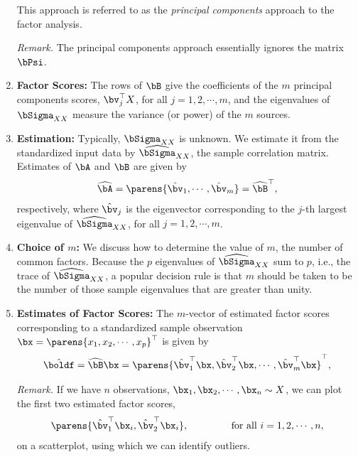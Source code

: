 \documentclass[12pt]{article}
\begin{document}
\begin{enumerate}[label=\textbf{\arabic*.}]
	This approach is referred to as the \emph{principal components} approach to the factor analysis. 
	
	\textit{Remark.} The principal components approach essentially ignores the matrix $\bPsi$. 
	
	\item \textbf{Factor Scores:} The rows of $\bB$ give the coefficients of the $m$ principal components scores, $\bv_j^\top X$, for all $j = 1, 2, \cdots, m$, and the eigenvalues of $\bSigma_{XX}$ measure the variance (or power) of the $m$ sources. 
	
	\item \textbf{Estimation:} Typically, $\bSigma_{XX}$ is unknown. We estimate it from the standardized input data by $\widehat{\bSigma}_{XX}$, the sample correlation matrix. Estimates of $\bA$ and $\bB$ are given by 
	\begin{align}
		\widehat{\bA} = \parens{\hat{\bv}_1, \cdots, \hat{\bv}_m} = \widehat{\bB}^\top, 
	\end{align}
	respectively, where $\hat{\bv}_j$ is the eigenvector corresponding to the $j$-th largest eigenvalue of $\widehat{\bSigma}_{XX}$, for all $j = 1, 2, \cdots, m$. 
	
	\item \textbf{Choice of $m$:} We discuss how to determine the value of $m$, the number of common factors. Because the $p$ eigenvalues of $\widehat{\bSigma}_{XX}$ sum to $p$, i.e., the trace of $\widehat{\bSigma}_{XX}$, a popular decision rule is that $m$ should be taken to be the number of those sample eigenvalues that are greater than unity. 
	
	\item \textbf{Estimates of Factor Scores:} The $m$-vector of estimated factor scores corresponding to a standardized sample observation $\bx = \parens{x_1, x_2, \cdots, x_p}^\top$ is given by 
	\begin{align}
		\hat{\boldf} = \widehat{\bB} \bx = \parens{\hat{\bv}_1^\top \bx, \hat{\bv}_2^\top \bx, \cdots, \hat{\bv}_m^\top \bx}^\top, 
	\end{align}
	
	\textit{Remark.} If we have $n$ observations, $\bx_1, \bx_2, \cdots, \bx_n \sim X$, we can plot the first two estimated factor scores, 
	\begin{align*}
		\parens{\hat{\bv}_1^\top \bx_i, \hat{\bv}_2^\top \bx_i}, \qquad \qquad \text{ for all } i = 1, 2, \cdots, n, 
	\end{align*}
	on a scatterplot, using which we can identify outliers. 
	

\end{enumerate}
\end{document}
